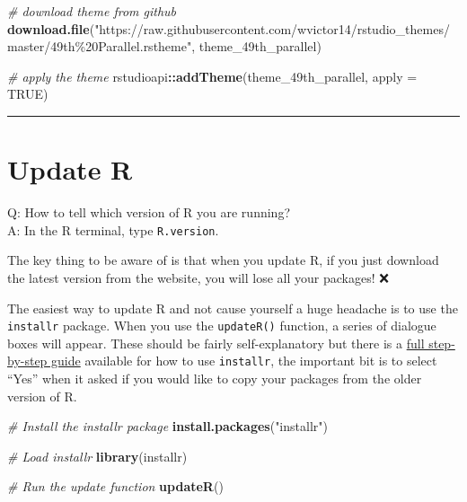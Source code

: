 \documentclass[
  a4paper,
  twoside,
  openright]{book}
\newenvironment{Shaded}{\begin{snugshade}}{\end{snugshade}}
\newcommand{\AttributeTok}[1]{\textcolor[rgb]{0.13,0.29,0.53}{#1}}
\newcommand{\CommentTok}[1]{\textcolor[rgb]{0.56,0.35,0.01}{\textit{#1}}}
\newcommand{\ConstantTok}[1]{\textcolor[rgb]{0.56,0.35,0.01}{#1}}
\newcommand{\FunctionTok}[1]{\textcolor[rgb]{0.13,0.29,0.53}{\textbf{#1}}}
\newcommand{\NormalTok}[1]{#1}
\newcommand{\SpecialCharTok}[1]{\textcolor[rgb]{0.81,0.36,0.00}{\textbf{#1}}}
\newcommand{\StringTok}[1]{\textcolor[rgb]{0.31,0.60,0.02}{#1}}
\theoremstyle{definition}
\theoremstyle{definition}
\theoremstyle{definition}
\theoremstyle{definition}
\theoremstyle{remark}
\begin{document}
\begin{itemize}
\begin{Shaded}
\begin{Highlighting}[]
\CommentTok{\# download theme from github}
\FunctionTok{download.file}\NormalTok{(}\StringTok{"https://raw.githubusercontent.com/wvictor14/rstudio\_themes/master/49th\%20Parallel.rstheme"}\NormalTok{, }
\NormalTok{              theme\_49th\_parallel)}

\CommentTok{\# apply the theme}
\NormalTok{rstudioapi}\SpecialCharTok{::}\FunctionTok{addTheme}\NormalTok{(theme\_49th\_parallel, }
                     \AttributeTok{apply =} \ConstantTok{TRUE}\NormalTok{)}
\end{Highlighting}
\end{Shaded}
\end{itemize}

\begin{center}\rule{0.5\linewidth}{0.5pt}\end{center}

\section{Update R}\label{update-r}

Q: How to tell which version of R you are running?\\
A: In the R terminal, type \texttt{R.version}.

The key thing to be aware of is that when you update R, {if you just download the latest version from the website, you will lose all your packages!} ❌

The easiest way to update R and not cause yourself a huge headache is to use the \texttt{installr} package. When you use the \texttt{updateR()} function, a series of dialogue boxes will appear. These should be fairly self-explanatory but there is a \href{https://www.r-statistics.com/2015/06/a-step-by-step-screenshots-tutorial-for-upgrading-r-on-windows/\#google_vignette}{full step-by-step guide} available for how to use \texttt{installr}, the important bit is to {select ``Yes'' when it asked if you would like to copy your packages from the older version of R}.

\begin{Shaded}
\begin{Highlighting}[]
\CommentTok{\# Install the installr package}
\FunctionTok{install.packages}\NormalTok{(}\StringTok{"installr"}\NormalTok{)}

\CommentTok{\# Load installr}
\FunctionTok{library}\NormalTok{(installr)}

\CommentTok{\# Run the update function}
\FunctionTok{updateR}\NormalTok{()}
\end{Highlighting}
\end{Shaded}
\end{document}
